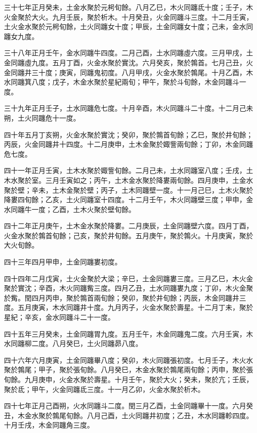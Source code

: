 \begin{pinyinscope}
三十七年正月癸未，土金水聚於元枵旬餘。八月乙巳，木火同躔氐十度；壬子，木火金聚於大火。九月壬辰，聚於析木。十月癸丑，火金同躔斗三度。十二月壬寅，土火金水聚於元枵旬餘，土火同躔女十度；甲辰，土金同躔女十度；己未，金水同躔女九度。

三十八年正月壬午，金水同躔牛四度。二月己酉，土水同躔虛六度。三月甲戌，土金同躔虛九度。五月丁酉，火金水聚於實沈。六月癸亥，聚於鶉首。七月己丑，火金同躔井三十度；庚寅，同躔鬼初度。八月甲戌，火金水聚於鶉尾。十月乙酉，木水同躔箕八度；戊子，木金水聚於星紀兩旬；甲午，聚於斗旬餘，木金同躔斗一度。

三十九年正月壬子，土水同躔危七度。十月辛酉，木火同躔斗二十度。十二月己未朔，土火同躔危十一度。

四十年五月丁亥朔，火金水聚於實沈；癸卯，聚於鶉首旬餘；乙巳，聚於井旬餘；丙辰，火金同躔井十四度。十二月庚申，土木金聚於娵訾兩旬餘；丁卯，木金同躔危七度。

四十一年正月壬寅，土木水聚於娵訾旬餘。二月己未，土水同躔室八度；壬戌，土木水聚於室。三月壬寅如之；丙午，土木金水聚於降婁兩旬餘。四月庚申，土金水聚於壁；辛未，土木金聚於壁；丙子，土木同躔壁一度。十一月己巳，土木火聚於降婁四旬餘；乙亥，土火同躔室十四度。十二月壬午，木火同躔壁三度；甲申，金水同躔牛一度；乙酉，土木火聚於壁旬餘。

四十二年正月庚午，土木金水聚於降婁。二月庚辰，土金同躔壁六度。四月丁酉，火金水聚於鶉首旬餘；己亥，聚於井旬餘。五月庚午，聚於鶉火。十月庚寅，聚於大火旬餘。

四十三年四月甲申，土金同躔婁初度。

四十四年二月戊寅，土火金聚於大梁；辛巳，土金同躔婁三度。三月乙巳，木火金聚於實沈；辛酉，木火同躔觜三度。四月乙丑，土水同躔婁九度；丁卯，木火金聚於觜。閏四月丙申，聚於鶉首兩旬餘；癸卯，聚於井旬餘；丙辰，木金同躔井三度。五月庚寅，木水同躔井十度。九月丙子，火金水聚於壽星。十二月丁未，聚於星紀；辛亥，金水同躔斗二十一度。

四十五年三月癸未，土金同躔胃九度。五月壬午，木金同躔鬼二度。六月壬寅，木水同躔柳二度。八月癸巳，土火同躔昴八度。

四十六年六月庚寅，土金同躔畢八度；癸卯，木火同躔張初度。七月壬子，木火水聚於鶉尾；甲子，聚於張旬餘。八月癸巳，木金水聚於鶉尾兩旬餘；丙申，聚於張旬餘。九月庚申，火金水聚於壽星。十月壬午，聚於大火；癸未，聚於亢；壬辰，聚於氐；甲午，火金同躔氐三度。十一月乙卯，火金水聚於析木。

四十七年正月己酉朔，火水同躔斗二度。閏三月乙酉，土金同躔畢十一度。六月癸丑，木金水聚於鶉尾旬餘。八月己酉，土火同躔井初度；乙丑，木水同躔軫四度。十月壬戌，木金同躔角三度。


\end{pinyinscope}
